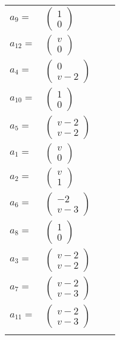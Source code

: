 \documentclass[1p]{elsarticle_modified}
\theoremstyle{definition}
\begin{document}
\begin{tabular}{m{7pt} m{180pt} m{7pt} m{180pt} }
\flushright $a_{9}=$&$\begin{pmatrix}1\\0\end{pmatrix}$ \\
\flushright $a_{12}=$&$\begin{pmatrix}v\\0\end{pmatrix}$ \\
\flushright $a_{4}=$&$\begin{pmatrix}0\\v-2\end{pmatrix}$ \\
\flushright $a_{10}=$&$\begin{pmatrix}1\\0\end{pmatrix}$ \\
\flushright $a_{5}=$&$\begin{pmatrix}v-2\\v-2\end{pmatrix}$ \\
\flushright $a_{1}=$&$\begin{pmatrix}v\\0\end{pmatrix}$ \\
\flushright $a_{2}=$&$\begin{pmatrix}v\\1\end{pmatrix}$ \\
\flushright $a_{6}=$&$\begin{pmatrix}-2\\v-3\end{pmatrix}$ \\
\flushright $a_{8}=$&$\begin{pmatrix}1\\0\end{pmatrix}$ \\
\flushright $a_{3}=$&$\begin{pmatrix}v-2\\v-2\end{pmatrix}$ \\
\flushright $a_{7}=$&$\begin{pmatrix}v-2\\v-3\end{pmatrix}$ \\
\flushright $a_{11}=$&$\begin{pmatrix}v-2\\v-3\end{pmatrix}$\\&\end{tabular}
\end{document}
